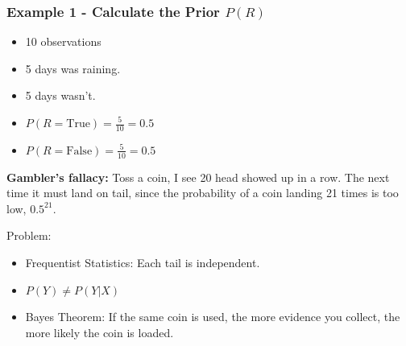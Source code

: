 \documentclass[aspectratio=169, 10pt]{beamer}
\begin{document}
\begin{frame}[t]
    \frametitle{Example 1 - Calculate the Prior $P(R)$}
        \begin{itemize}
            \item 10 observations
            \item 5 days was raining.
            \item 5 days wasn't.
            \pause
            \item $P(R=\text{True}) = \frac{5}{10} = 0.5$
            \item $P(R=\text{False}) = \frac{5}{10} = 0.5$
        \end{itemize}
    
    \pause
    \begin{example}
        \textbf{Gambler's fallacy:} Toss a coin, I see 20 head showed up in a row.
        The next time it must land on tail, since the probability of a coin landing 21 times is too low, $0.5^{21}$.
    \end{example}
    \pause
    Problem:
    \begin{itemize}
        \item Frequentist Statistics: Each tail is independent.
        \item $P(Y) \neq P(Y|X)$
        \item Bayes Theorem: If the same coin is used, the more evidence you collect, the more likely the coin is loaded.
    \end{itemize}
\end{frame}
\end{document}
